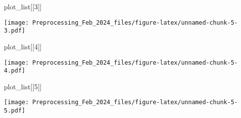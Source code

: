 \documentclass[
]{article}
\newenvironment{Shaded}{\begin{snugshade}}{\end{snugshade}}
\newcommand{\DecValTok}[1]{\textcolor[rgb]{0.00,0.00,0.81}{#1}}
\newcommand{\NormalTok}[1]{#1}
\begin{document}
\begin{Shaded}
\begin{Highlighting}[]
\NormalTok{plot\_list[[}\DecValTok{3}\NormalTok{]]}
\end{Highlighting}
\end{Shaded}

\texttt{[image: Preprocessing\_Feb\_2024\_files/figure-latex/unnamed-chunk-5-3.pdf]}

\begin{Shaded}
\begin{Highlighting}[]
\NormalTok{plot\_list[[}\DecValTok{4}\NormalTok{]]}
\end{Highlighting}
\end{Shaded}

\texttt{[image: Preprocessing\_Feb\_2024\_files/figure-latex/unnamed-chunk-5-4.pdf]}

\begin{Shaded}
\begin{Highlighting}[]
\NormalTok{plot\_list[[}\DecValTok{5}\NormalTok{]]}
\end{Highlighting}
\end{Shaded}

\texttt{[image: Preprocessing\_Feb\_2024\_files/figure-latex/unnamed-chunk-5-5.pdf]}
\end{document}

